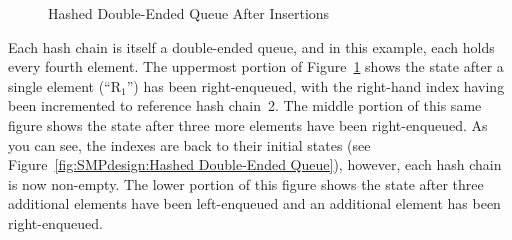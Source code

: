 \begin{figure}[tb]
\centering
{}
\caption{Hashed Double-Ended Queue After Insertions}
\label{fig:SMPdesign:Hashed Double-Ended Queue After Insertions}
\end{figure}

Each hash chain is itself a double-ended queue, and in this example,
each holds every fourth element.
The uppermost portion of
Figure~\ref{fig:SMPdesign:Hashed Double-Ended Queue After Insertions}
shows the state after a single element (``R$_1$'') has been
right-enqueued, with the right-hand index having been incremented to
reference hash chain~2.
The middle portion of this same figure shows the state after
three more elements have been right-enqueued.
As you can see, the indexes are back to their initial states
(see Figure~\ref{fig:SMPdesign:Hashed Double-Ended Queue}), however,
each hash chain is now non-empty.
The lower portion of this figure shows the state after three additional
elements have been left-enqueued and an additional element has been
right-enqueued.

